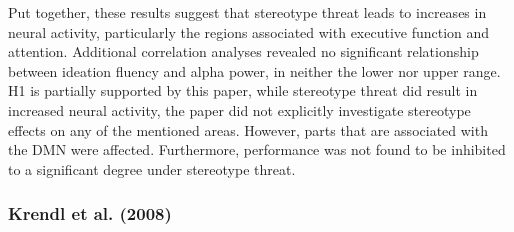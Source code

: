 \documentclass[
  stu,floatsintext]{apa7}
\begin{document}
Put together, these results suggest that stereotype threat leads to increases in neural activity, particularly the regions associated with executive function and attention.
Additional correlation analyses revealed no significant relationship between ideation fluency and alpha power, in neither the lower nor upper range.
H1 is partially supported by this paper, while stereotype threat did result in increased neural activity, the paper did not explicitly investigate stereotype effects on any of the mentioned areas. However, parts that are associated with the DMN were affected. Furthermore, performance was not found to be inhibited to a significant degree under stereotype threat.

\subsubsection{Krendl et al. (2008)}\label{krendlnegativeconsequencesthreat2008}
\end{document}
